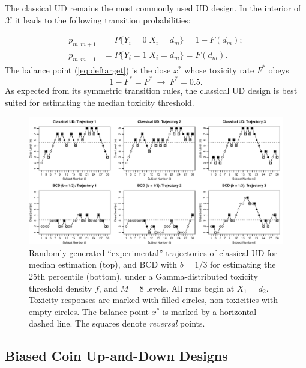 The classical UD remains the most commonly used UD design. In the interior of $\mathcal{X}$ it leads to the following transition probabilities:

\begin{equation}
\begin{array}{rl}
p_{m,m+1}&=P\{Y_i=0|X_i=d_m\}=1-F(d_m);\\
p_{m,m-1}&=P\{Y_i=1|X_i=d_m\}=F(d_m).
\end{array}
\end{equation}
The balance point (\ref{eq:deftarget}) is the dose $x^*$ whose toxicity rate $F^*$ obeys
\begin{equation*}
1-F^*=F^*\ \longrightarrow \   F^*=0.5.
\end{equation*}
As expected from its symmetric transition rules, the classical UD design is best suited for estimating the median toxicity threshold.

\begin{figure}
\begin{center}
\includegraphics[scale=0.65]{Traject2}
\caption{Randomly generated ``experimental'' trajectories of classical UD for median estimation (top), and BCD with $b=1/3$ for estimating the 25th percentile (bottom), under a Gamma-distributed toxicity threshold density $f$, and $M=8$ levels. All runs begin at $X_1=d_2$. Toxicity responses are marked with filled circles, non-toxicities with empty circles. The balance point $x^*$ is marked by a horizontal dashed line. The squares denote \emph{reversal} points.}\label{fig:traject}
\end{center}
\end{figure}

\subsection{Biased Coin Up-and-Down Designs}

